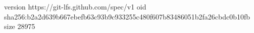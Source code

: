 version https://git-lfs.github.com/spec/v1
oid sha256:b2a2d639b667ebefb63c93b9c933255c480f607b83486051b2fa26cbdc0b10fb
size 28975
